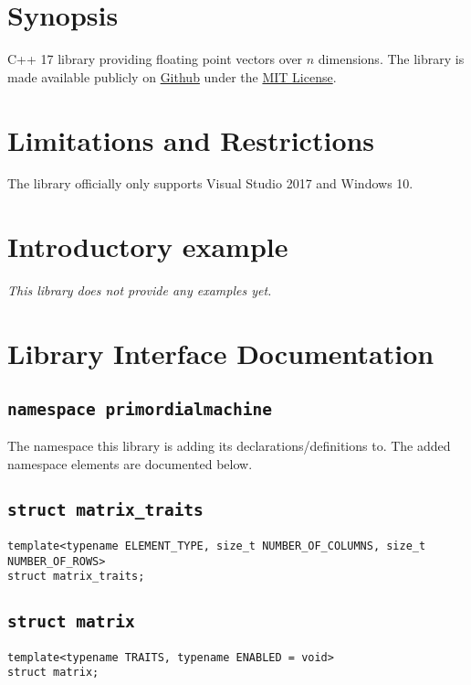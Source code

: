 \documentclass[oneside]{book}
\begin{document}
\maketitle
\tableofcontents
\chapter{Synopsis}
C++ 17 library providing floating point vectors over $n$ dimensions.
The library is made available publicly on
\href{\GetLibraryRepository}{Github}
under the
\href{\GetLibraryRepository/blob/master/LICENSE}{MIT License}.

\chapter{Limitations and Restrictions}
The library officially only supports Visual Studio 2017 and Windows 10.

\chapter{Introductory example}
\textit{\color{orange}This library does not provide any examples yet.}



\chapter{Library Interface Documentation}

\section{\texttt{namespace primordialmachine}}
The namespace this library is adding its declarations/definitions to.
The added namespace elements are documented below.



\section{\texttt{struct matrix\_traits}}
\begin{verbatim}
template<typename ELEMENT_TYPE, size_t NUMBER_OF_COLUMNS, size_t NUMBER_OF_ROWS>
struct matrix_traits;
\end{verbatim}

\section{\texttt{struct matrix}}
\begin{verbatim}
template<typename TRAITS, typename ENABLED = void>
struct matrix;
\end{verbatim}
\end{document}
